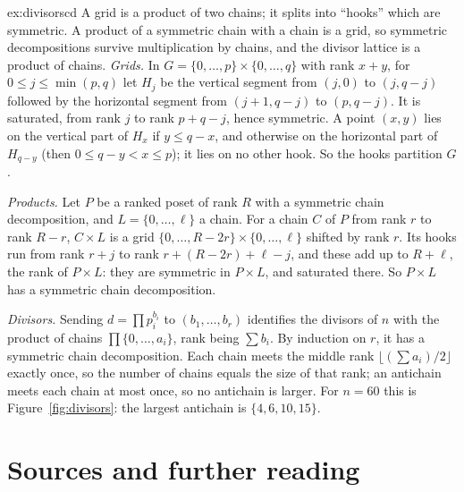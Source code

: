 \begin{solution}{ex:divisorscd}
\idea A grid is a product of two chains; it splits into ``hooks'' which are symmetric. A product of a symmetric chain with a chain
is a grid, so symmetric decompositions survive multiplication by chains, and the divisor lattice is a product of chains.
\writeup \emph{Grids.} In $G=\{0,\dots,p\}\times\{0,\dots,q\}$ with rank $x+y$, for $0\le j\le\min(p,q)$ let $H_j$ be the vertical segment from $(j,0)$ to $(j,q-j)$
followed by the horizontal segment from $(j+1,q-j)$ to $(p,q-j)$. It is saturated, from rank $j$ to rank $p+q-j$, hence symmetric. A
point $(x,y)$ lies on the vertical part of $H_x$ if $y\le q-x$, and otherwise on the horizontal part of $H_{q-y}$ (then $0\le q-y<x\le p$); it
lies on no other hook. So the hooks partition $G$.

\emph{Products.} Let $P$ be a ranked poset of rank $R$ with a symmetric chain decomposition, and $L=\{0,\dots,\ell\}$ a chain. For a chain $C$
of $P$ from rank $r$ to rank $R-r$, $C\times L$ is a grid $\{0,\dots,R-2r\}\times\{0,\dots,\ell\}$ shifted by rank $r$. Its hooks run from rank $r+j$ to rank
$r+(R-2r)+\ell-j$, and these add up to $R+\ell$, the rank of $P\times L$: they are symmetric in $P\times L$, and saturated there. So $P\times L$ has a
symmetric chain decomposition.

\emph{Divisors.} Sending $d=\prod p_i^{b_i}$ to $(b_1,\dots,b_r)$ identifies the divisors of $n$ with the product of chains $\prod\{0,\dots,a_i\}$, rank being
$\sum b_i$. By induction on $r$, it has a symmetric chain decomposition. Each chain meets the middle rank $\lfloor(\sum a_i)/2\rfloor$ exactly
once, so the number of chains equals the size of that rank; an antichain meets each chain at most once, so no antichain is
larger. For $n=60$ this is Figure~\ref{fig:divisors}: the largest antichain is $\{4,6,10,15\}$.
\end{solution}

\section*{Sources and further reading}


